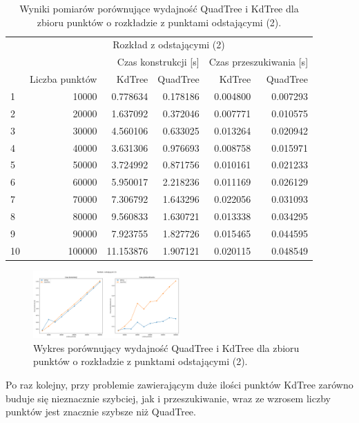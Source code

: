 \documentclass{lab}
\begin{document}
\begin{table}[H]
\centering
\begin{tabular}{lrrrrr}
  \toprule
   & \multicolumn{5}{c}{Rozkład z odstającymi (2)} \\
   &  & \multicolumn{2}{r}{Czas konstrukcji [s]} & \multicolumn{2}{r}{Czas przeszukiwania [s]} \\
   & Liczba punktów & KdTree & QuadTree & KdTree & QuadTree \\
  \midrule
  1 & 10000 & 0.778634 & 0.178186 & 0.004800 & 0.007293 \\
  2 & 20000 & 1.637092 & 0.372046 & 0.007771 & 0.010575 \\
  3 & 30000 & 4.560106 & 0.633025 & 0.013264 & 0.020942 \\
  4 & 40000 & 3.631306 & 0.976693 & 0.008758 & 0.015971 \\
  5 & 50000 & 3.724992 & 0.871756 & 0.010161 & 0.021233 \\
  6 & 60000 & 5.950017 & 2.218236 & 0.011169 & 0.026129 \\
  7 & 70000 & 7.306792 & 1.643296 & 0.022056 & 0.031093 \\
  8 & 80000 & 9.560833 & 1.630721 & 0.013338 & 0.034295 \\
  9 & 90000 & 7.923755 & 1.827726 & 0.015465 & 0.044595 \\
  10 & 100000 & 11.153876 & 1.907121 & 0.020115 & 0.048549 \\
  \bottomrule
  \end{tabular}
\caption{Wyniki pomiarów porównujące wydajność QuadTree i KdTree dla zbioru punktów o rozkładzie z punktami odstającymi (2).}
\label{tab:outlier_time_2}
\end{table}  

\begin{figure}[H]
  \centering
  \includegraphics[width=0.5\textwidth]{resources/outlier_graph_2.png}
  \caption{Wykres porównujący wydajność QuadTree i KdTree dla zbioru punktów o rozkładzie z punktami odstającymi (2).}
  \label{fig:outlier_graph_2}
\end{figure}

Po raz kolejny, przy problemie zawierającym duże ilości punktów KdTree zarówno buduje się nieznacznie szybciej, jak i przeszukiwanie, wraz ze wzrosem liczby punktów jest znacznie szybsze niż QuadTree.
\end{document}
